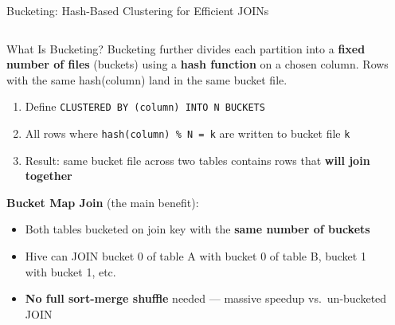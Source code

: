 \documentclass[aspectratio=169,10pt]{beamer}
\begin{document}
\begin{frame}{Bucketing: Hash-Based Clustering for Efficient JOINs}
  \begin{columns}[T]
      \begin{block}{What Is Bucketing?}
        Bucketing further divides each partition into a \textbf{fixed number of files} (buckets) using a \textbf{hash function} on a chosen column.  Rows with the same hash(column) land in the same bucket file.
        \vspace{4pt}
        \begin{enumerate}
          \item Define \texttt{CLUSTERED BY (column) INTO N BUCKETS}
          \item All rows where \texttt{hash(column) \% N = k} are written to bucket file \texttt{k}
          \item Result: same bucket file across two tables contains rows that \textbf{will join together}
        \end{enumerate}
        \vspace{4pt}
        \textbf{Bucket Map Join} (the main benefit):
        \begin{itemize}
          \item Both tables bucketed on join key with the \textbf{same number of buckets}
          \item Hive can JOIN bucket 0 of table A with bucket 0 of table B, bucket 1 with bucket 1, etc.
          \item \textbf{No full sort-merge shuffle} needed — massive speedup vs.\ un-bucketed JOIN
        \end{itemize}
      \end{block}

      \begin{center}
\end{center}
\end{columns}
\end{frame}
\end{document}
